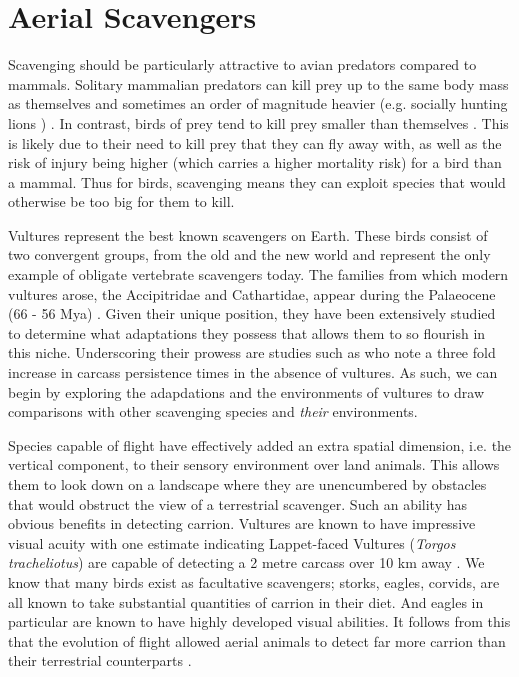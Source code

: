 \documentclass[a4paper,12pt]{article}
\begin{document}
\section*{Aerial Scavengers}
Scavenging should be particularly attractive to avian predators compared to mammals. Solitary mammalian predators can kill prey up to the same body mass as themselves and sometimes an order of magnitude heavier (e.g. socially hunting lions \citep{owen2008predator}) . In contrast, birds of prey tend to kill prey smaller than themselves \citep{slagsvold2007prey}. This is likely due to their need to kill prey that they can fly away with, as well as the risk of injury being higher (which carries a higher mortality risk) for a bird than a mammal. Thus for birds, scavenging means they can exploit species that would otherwise be too big for them to kill. 

Vultures represent the best known scavengers on Earth. These birds consist of two convergent groups, from the old and the new world and represent the only example of obligate vertebrate scavengers today. The families from which modern vultures arose, the Accipitridae and Cathartidae, appear during the Palaeocene (66 - 56 Mya) \citep{Jetz2012, Jarvis2014}. Given their unique position, they have been extensively studied to determine what adaptations they possess that allows them to so flourish in this niche. Underscoring their prowess are studies such as \cite{ogada2012effects} who note a three fold increase in carcass persistence times in the absence of vultures. As such, we can begin by exploring the adapdations and the environments of vultures to draw comparisons with other scavenging species and \textit{their} environments. 



Species capable of flight have effectively added an extra spatial dimension, i.e. the vertical component, to their sensory environment over land animals. This allows them to look down on a landscape where they are unencumbered by obstacles that would obstruct the view of a terrestrial scavenger. Such an ability has obvious benefits in detecting carrion. Vultures are known to have impressive visual acuity with one estimate indicating Lappet-faced Vultures (\textit{Torgos tracheliotus}) are capable of detecting a 2 metre carcass over 10 km away \citep{spiegel2013factors}. We know that many birds exist as facultative scavengers; storks, eagles, corvids, are all known to take substantial quantities of carrion in their diet. And eagles in particular are known to have highly developed visual abilities. It follows from this that the evolution of flight allowed aerial animals to detect far more carrion than their terrestrial counterparts \citep{AR:AR22815}.
\end{document}
